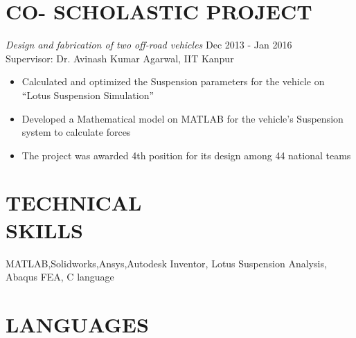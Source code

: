 \documentclass[margin, 10pt]{res} %
\begin{document}
\begin{resume}
\begin{itemize}
\end{itemize}



\section{CO- SCHOLASTIC PROJECT} 
{\sl{Design and fabrication of two off-road vehicles}  } \hfill Dec 2013 - Jan 2016 \\
Supervisor: Dr. Avinash Kumar Agarwal, IIT Kanpur\\
\begin{itemize}
\item Calculated and optimized the Suspension parameters for the vehicle on “Lotus Suspension Simulation”
\item Developed a Mathematical model on MATLAB for the vehicle's Suspension system to calculate forces 
\item The project was awarded 4th position for its design among 44 national teams 
\end{itemize}






\section{TECHNICAL \\ SKILLS} 

MATLAB,Solidworks,Ansys,Autodesk Inventor, Lotus Suspension Analysis, Abaqus FEA, C language\\

\section{LANGUAGES }%


\end{resume}
\end{document}
